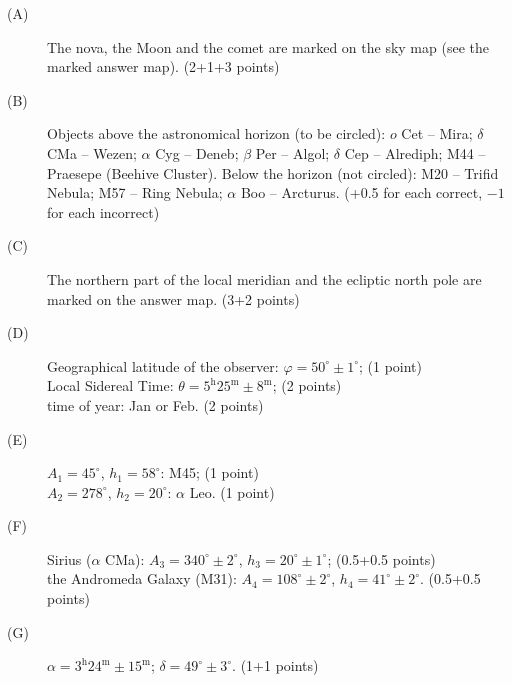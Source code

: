 \begin{description}
\item[(A)] The nova, the Moon and the comet are marked on the sky map (see
  the marked answer map). \hfill(2+1+3 points)
\item[(B)] Objects above the astronomical horizon (to be circled):
  $o$ Cet -- Mira; $\delta$ CMa -- Wezen; $\alpha$ Cyg -- Deneb;
  $\beta$ Per -- Algol; $\delta$ Cep -- Alrediph; M44 -- Praesepe (Beehive
  Cluster). Below the horizon (not circled): M20 -- Trifid Nebula;
  M57 -- Ring Nebula; $\alpha$ Boo -- Arcturus.
  \hfill(+0.5 for each correct, $-1$ for each incorrect)
\item[(C)] The northern part of the local meridian and the ecliptic north
  pole are marked on the answer map. \hfill(3+2 points)
\item[(D)] Geographical latitude of the observer:
  $\varphi = 50^\circ \pm 1^\circ$; \hfill(1 point)\\
  Local Sidereal Time:
  $\theta = 5^{\mathrm{h}}25^{\mathrm{m}} \pm 8^{\mathrm{m}}$;
  \hfill(2 points)\\
  time of year: Jan or Feb. \hfill(2 points)
\item[(E)] $A_1 = 45^\circ$, $h_1 = 58^\circ$: M45; \hfill(1 point)\\
  $A_2 = 278^\circ$, $h_2 = 20^\circ$: $\alpha$ Leo. \hfill(1 point)
\item[(F)] Sirius ($\alpha$ CMa):
  $A_3 = 340^\circ \pm 2^\circ$, $h_3 = 20^\circ \pm 1^\circ$;
  \hfill(0.5+0.5 points)\\
  the Andromeda Galaxy (M31):
  $A_4 = 108^\circ \pm 2^\circ$, $h_4 = 41^\circ \pm 2^\circ$.
  \hfill(0.5+0.5 points)
\item[(G)] $\alpha = 3^{\mathrm{h}}24^{\mathrm{m}} \pm 15^{\mathrm{m}}$;
  $\delta = 49^\circ \pm 3^\circ$. \hfill(1+1 points)
\end{description}

